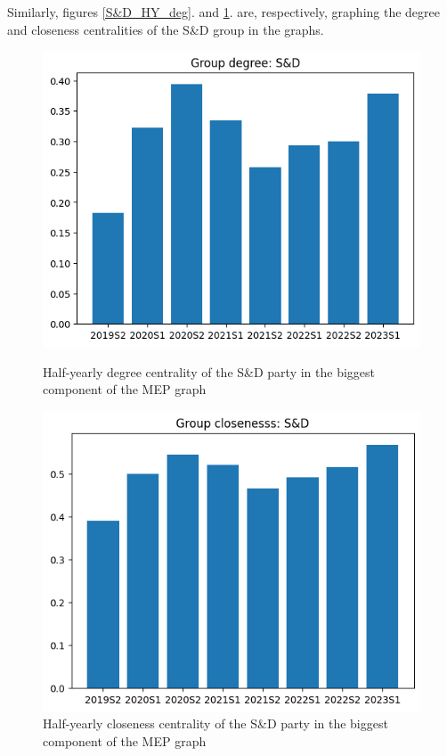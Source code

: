 \documentclass[lettersize,journal]{IEEEtran}
\begin{document}
Similarly, figures \ref{S&D_HY_deg}. and \ref{S&D_HY_cls}. are, respectively, graphing the degree and closeness centralities of the S\&D group in the graphs.

\begin{figure}[h]
  \centering
  \begin{minipage}[b]{0.23\textwidth}
    \includegraphics[width=\textwidth]{S&D_HY_deg.png}
    \caption{Half-yearly degree centrality of the S\&D party in the biggest component of the MEP graph}
    \label{S&D_HY_deg}
  \end{minipage}
  \hfill
  \begin{minipage}[b]{0.23\textwidth}
    \includegraphics[width=\textwidth]{S&D_HY_cls.png}
    \caption{Half-yearly closeness centrality of the S\&D party in the  biggest component of the MEP graph}
    \label{S&D_HY_cls}
  \end{minipage}
\end{figure}
\end{document}
